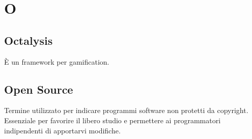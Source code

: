 \section*{O}

\subsection{Octalysis}
È un framework per gamification.

\subsection{Open Source}
Termine utilizzato per indicare programmi software non protetti da copyright. Essenziale per favorire il libero studio e permettere ai programmatori indipendenti di apportarvi modifiche.
